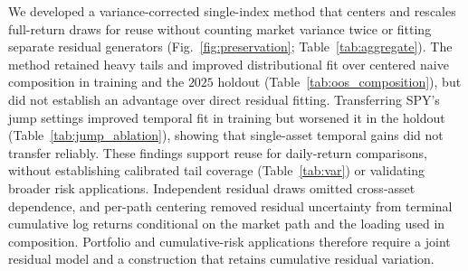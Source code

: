 We developed a variance-corrected single-index method that centers and
rescales full-return draws for reuse without counting market variance
twice or fitting separate residual generators
(Fig.~\ref{fig:preservation}; Table~\ref{tab:aggregate}). The method
retained heavy tails and improved distributional fit over centered
naive composition in training and the $2025$ holdout
(Table~\ref{tab:oos_composition}), but did not establish an advantage
over direct residual fitting. Transferring SPY's jump settings
improved temporal fit in training but worsened it in the holdout
(Table~\ref{tab:jump_ablation}), showing that single-asset temporal
gains did not transfer reliably. These findings support reuse for
daily-return comparisons, without establishing calibrated tail
coverage (Table~\ref{tab:var}) or validating broader risk applications.
Independent residual draws omitted cross-asset dependence, and
per-path centering removed residual uncertainty from terminal
cumulative log returns conditional on the market path and the loading
used in composition. Portfolio and cumulative-risk applications therefore require
a joint residual model and a construction that retains cumulative
residual variation.
